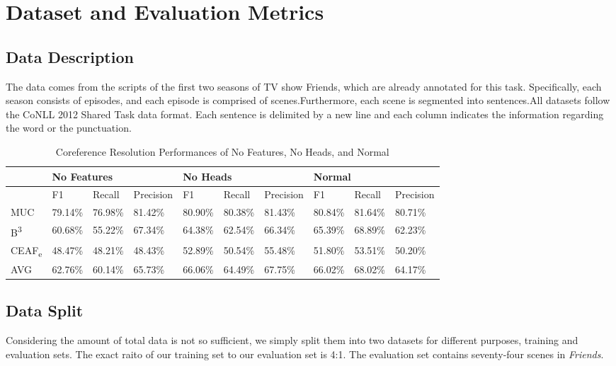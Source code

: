 \documentclass[11pt]{article}
\begin{document}
\section{Dataset and Evaluation Metrics}
\subsection{Data Description}
The data comes from the scripts of the first two seasons of TV show Friends, which are already annotated for this task. Specifically, each season consists of episodes, and each episode is comprised of scenes.Furthermore, each scene is segmented into sentences.All datasets follow the CoNLL 2012 Shared Task data format. Each sentence is delimited by a new line and each column indicates the information regarding the word or the punctuation.
\begin{table}[]
\centering
\label{my-label}
\begin{tabular}{|l|l|l|l|l|l|l|l|l|l|}
\hline
        & \multicolumn{3}{l|}{No Features} & \multicolumn{3}{l|}{No Heads} & \multicolumn{3}{l|}{Normal}   \\ \hline
        & F1       & Recall   & Precision  & F1      & Recall  & Precision & F1      & Recall  & Precision \\ \hline
MUC     & 79.14\%  & 76.98\%  & 81.42\%    & 80.90\% & 80.38\% & 81.43\%   & 80.84\% & 81.64\% & 80.71\%   \\ \hline
B\textsuperscript{3}      & 60.68\%  & 55.22\%  & 67.34\%    & 64.38\% & 62.54\% & 66.34\%   & 65.39\% & 68.89\% & 62.23\%   \\ \hline
CEAF\textsubscript{e} & 48.47\%  & 48.21\%  & 48.43\%    & 52.89\% & 50.54\% & 55.48\%   & 51.80\% & 53.51\% & 50.20\%   \\ \hline
AVG     & 62.76\%  & 60.14\%  & 65.73\%    & 66.06\% & 64.49\% & 67.75\%   & 66.02\% & 68.02\% & 64.17\%   \\ \hline
\end{tabular}
\caption{Coreference Resolution Performances of No Features, No Heads, and Normal}
\end{table}
\subsection{Data Split}
Considering the amount of total data is not so sufficient, we simply split them into two datasets for different purposes, training and evaluation sets. The exact raito of our training set to our evaluation set is 4:1. The evaluation set contains seventy-four scenes in \textit{Friends}.
\end{document}
